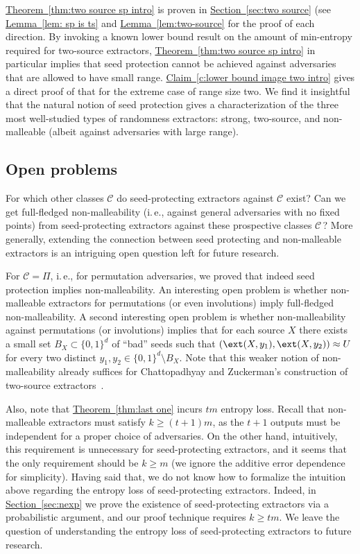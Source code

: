 \documentclass[11pt]{article}
\numberwithin{equation}{section}
\theoremstyle{definition}
\theoremstyle{plain}
\newcommand{\ie}{i.\,e.}
\newcommand{\expref}[2]{\hyperref[#2]{#1~\ref{#2}}}
\begin{document}
\expref{Theorem}{thm:two source sp intro} is proven in \expref{Section}{sec:two source} (see \expref{Lemma}{lem: sp is ts} and \expref{Lemma}{lem:two-source} for the proof of each direction. %
By invoking a known lower bound result on the amount of min-entropy required for two-source extractors, \expref{Theorem}{thm:two source sp intro} in particular implies that seed protection cannot be achieved against adversaries that are allowed to have small range. \expref{Claim}{c:lower bound image two intro} gives a direct proof of that for
%
%
the  %
extreme case of range size two. We find it insightful that the
%
natural notion of seed protection gives a characterization of the three most well-studied types of randomness extractors: strong, two-source, and non-malleable (albeit against adversaries with large range).



\subsection{Open problems}

For which other classes $\mathcal{C}$ do seed-protecting extractors against $\mathcal{C}$ exist?
Can we get full-fledged non-malleability (\ie,
against general adversaries with no fixed points) from seed-protecting extractors against these prospective %
%
classes $\mathcal C\,$?
More generally, extending the connection between seed protecting and non-malleable extractors is an intriguing open question left for future research.

%
%
%
%
%

For $\mathcal{C} = \Pi$, \ie, for permutation adversaries, we proved that indeed seed protection implies 
non-malleability. An interesting open problem is whether non-malleable extractors for permutations (or even involutions) imply full-fledged non-malleability.
A second interesting open problem is whether non-malleability against permutations (or involutions) implies that for each source $X$ there exists a small set $B_X \subset \{0,1\}^d$ of
``bad'' seeds such that $(\ext(X,y_1),\ext(X,y_2)) \approx U$ for every two distinct $y_1,y_2 \in \{0,1\}^d \setminus B_X$. Note that this 
weaker notion of non-malleability already suffices for Chattopadhyay and Zuckerman's construction of %
two-source  %
extractors~\cite{CZ19}.

Also, note that \expref{Theorem}{thm:last one} incurs $tm$ entropy loss. Recall that non-malleable extractors must satisfy $k \ge (t+1)m$, as the $t+1$ outputs must be independent for a proper choice of adversaries. On the other hand, intuitively, this requirement is unnecessary for seed-protecting extractors, and it seems that the only requirement should be $k \ge m$ (we ignore the additive error dependence for simplicity).  Having said that, we do not know how to formalize the intuition above regarding the entropy loss of seed-protecting extractors. Indeed, in \expref{Section}{sec:nexp} we prove the existence of seed-protecting extractors via a probabilistic argument, and our proof technique requires $k \ge tm$. We leave the question of understanding the entropy loss of seed-protecting extractors to future research.
\end{document}
